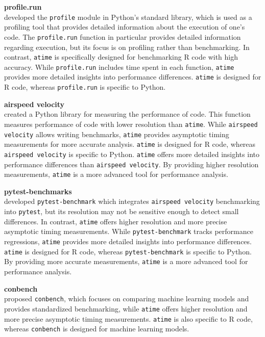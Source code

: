 \textbf{profile.run} \\
\citet{profile} developed the \texttt{profile} module in Python's standard library, which is used as a profiling tool that provides detailed information about the execution of one's code. The \texttt{profile.run} function in particular provides detailed information regarding execution, but its focus is on profiling rather than benchmarking. In contrast, \texttt{atime} is specifically designed for benchmarking R code with high accuracy. While \texttt{profile.run} includes time spent in each function, \texttt{atime} provides more detailed insights into performance differences. \texttt{atime} is designed for R code, whereas \texttt{profile.run} is specific to Python.
\vspace{0.1in}

\textbf{airspeed velocity} \\
\citet{airspeed_velocity} created a Python library for measuring the performance of code. This function measures performance of code with lower resolution than \texttt{atime}. While \texttt{airspeed velocity} allows writing benchmarks, \texttt{atime} provides asymptotic timing measurements for more accurate analysis. \texttt{atime} is designed for R code, whereas \texttt{airspeed velocity} is specific to Python. \texttt{atime} offers more detailed insights into performance differences than \texttt{airspeed velocity}. By providing higher resolution measurements, \texttt{atime} is a more advanced tool for performance analysis.
 
\vspace{0.1in}

\textbf{pytest-benchmarks} \\
\citet{pytest_benchmark} developed \texttt{pytest-benchmark} which integrates \texttt{airspeed velocity} benchmarking into \texttt{pytest}, but its resolution may not be sensitive enough to detect small differences. In contrast, \texttt{atime} offers higher resolution and more precise asymptotic timing measurements. While \texttt{pytest-benchmark} tracks performance regressions, \texttt{atime} provides more detailed insights into performance differences. \texttt{atime} is designed for R code, whereas \texttt{pytest-benchmark} is specific to Python. By providing more accurate measurements, \texttt{atime} is a more advanced tool for performance analysis.
\vspace{0.1in}

\textbf{conbench} \\
\citet{conbench} proposed \texttt{conbench}, which focuses on comparing machine learning models and provides standardized benchmarking, while \texttt{atime} offers higher resolution and more precise asymptotic timing measurements. \texttt{atime} is also specific to R code, whereas \texttt{conbench} is designed for machine learning models.
\vspace{0.1in}

